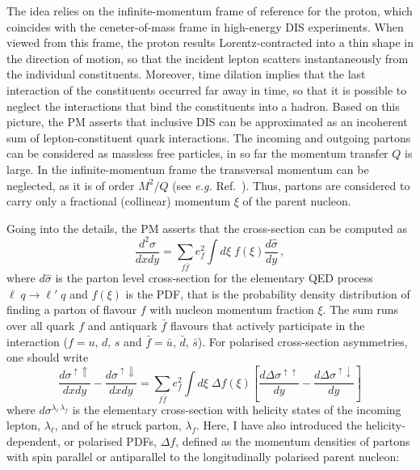 The idea relies on the infinite-momentum frame of reference for the proton, which coincides with the ceneter-of-mass frame in high-energy DIS experiments. When viewed from this frame, the proton results Lorentz-contracted into a thin shape in the direction of motion, so that the incident lepton scatters instantaneously from the individual constituents. Moreover, time dilation implies that the last interaction of the constituents occurred far away in time, so that it is possible to neglect the interactions that bind the constituents into a hadron. Based on this picture, the PM asserts that inclusive DIS can be approximated as an incoherent sum of lepton-constituent quark interactions. The incoming and outgoing partons can be considered as massless free particles, in so far the momentum transfer $Q$ is large. In the infinite-momentum frame the transversal momentum can be neglected, as it is of order $M^2/Q$ (see \textit{e.g.} Ref.~\cite{collins_2011}). Thus, partons are considered to carry only a fractional (collinear) momentum $\xi$ of the parent nucleon.\par
Going into the details, the PM asserts that the cross-section can be computed as
\begin{equation}
  \frac{d^2 \sigma}{dx dy} = \sum_{f\bar{f}} e_f^2 \int d\xi \;f (\xi) \frac{d \hat{\sigma}}{dy}\,,
  \label{eq:PM_CS}
\end{equation}
where $d \hat{\sigma}$ is the parton level cross-section for the elementary QED process $\ell \; q \rightarrow \ell' \; q$ and $f(\xi)$ is the PDF, that is the probability density distribution of finding a parton of flavour $f$ with nucleon momentum fraction $\xi$. The sum runs over all quark $f$ and antiquark $\bar{f}$ flavours that actively participate in the interaction ($f = u,\, d,\, s$ and $\bar{f} = \bar{u},\, \bar{d},\, \bar{s}$). For polarised cross-section asymmetries, one should write
\begin{equation}
  \frac{d \sigma^{\uparrow \Uparrow}}{dx dy} - \frac{d \sigma^{\uparrow \Downarrow}}{dx dy} = \sum_{f\bar{f}} e_f^2 \int d\xi \; \Delta f (\xi) \left[ \frac{d \Delta \sigma^{\uparrow \uparrow}}{dy} - \frac{d \Delta \sigma^{\uparrow \downarrow}}{dy} \right]
  \label{eq:PM_fact}
\end{equation}
where $d \sigma^{\lambda_{\ell} \, \lambda_{f}}$ is the elementary cross-section with helicity states of the incoming lepton, $\lambda_{\ell}$, and of he struck parton, $\lambda_{f}$. Here, I have also introduced the helicity-dependent, or polarised PDFs, $\Delta f$, defined as the momentum densities of partons with spin parallel or antiparallel to the longitudinally polarised parent nucleon:

